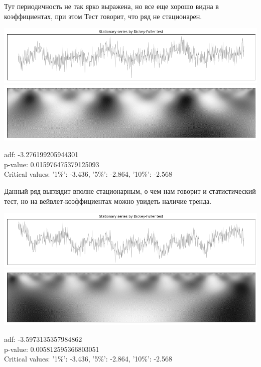 \documentclass[a4paper]{article}
\begin{document}
	Тут периодичность не так ярко выражена, но все еще хорошо видна в коэффициентах, при этом Тест говорит, что ряд не стационарен.
	
	\vspace{2em}
	
	\begin{center}
		\includegraphics[scale=0.45]{./output_11_0.png}
		\includegraphics[scale=0.45]{./output_11_1.png}
		
		adf: -3.276199205944301 \\
		p-value: 0.015976475379125093 \\
		Critical values: {'1\%': -3.436, '5\%': -2.864, '10\%':
			-2.568}
	\end{center}
	
	Данный ряд выглядит вполне стационарным, о чем нам говорит и статистический тест, но на вейвлет-коэффициентах можно увидеть наличие тренда.
	
	\begin{center}
		\includegraphics[scale=0.45]{./output_12_0.png}
		\includegraphics[scale=0.45]{./output_12_1.png}
		
		adf: -3.5973135357984862 \\
		p-value: 0.005812595366803051 \\
		Critical values: {'1\%': -3.436, '5\%': -2.864, '10\%':
			-2.568}
	\end{center}
\end{document}

